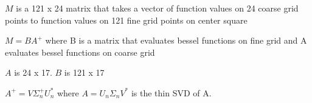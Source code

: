 \documentclass{article}
\begin{document}
$M$ is a 121 x 24 matrix that takes a vector of function values on 24 coarse grid points to function values on 121 fine grid points on center square

$M = BA^{+}$ where B is a matrix that evaluates bessel functions on fine grid and A evaluates bessel functions on coarse grid 

$A$ is 24 x 17.
$B$ is 121 x 17

$A^{+} = V \Sigma_{n}^{+} U_{n}^{*}$ where $A = U_{n} \Sigma_{n} V^{*}$ is the thin SVD of A.
\end{document}
